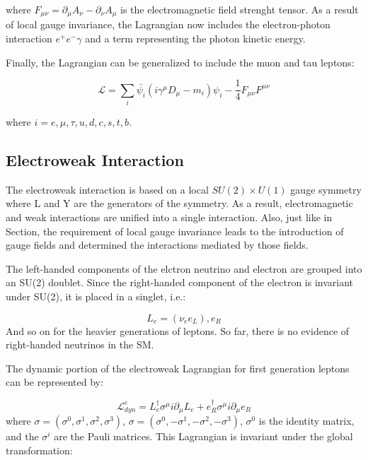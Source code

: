 where $F_{\mu\nu}= \partial_{\mu}A_{\nu} - \partial_{\nu}A_{\mu}$ is the electromagnetic field strenght tensor. As a result of local gauge invariance, the Lagrangian now includes the electron-photon interaction $e^{+}e^{-}\gamma$ and a term representing the photon kinetic energy.

Finally, the Lagrangian can be generalized to include the muon and tau leptons:

\begin{equation}
\mathcal{L} = \sum_{i}\bar{\psi_{i}}(i\gamma^{\mu}D_{\mu}-m_{i})\psi_{i} - \frac{1}{4}F_{\mu\nu}F^{\mu\nu}
\end{equation}

where $i=e,\mu,\tau,u,d,c,s,t,b$.

\subsection{Electroweak Interaction}

The electroweak interaction is based on a local $SU(2)\times U(1)$ gauge symmetry where L and Y are the generators of the symmetry. As a result, electromagnetic and weak interactions are unified into a single interaction. Also, just like in Section, the requirement of local gauge invariance leads to the introduction of gauge fields and determined the interactions mediated by those fields.

The left-handed components of the elctron neutrino and electron are grouped into an SU(2) doublet. Since the right-handed component of the electron is invariant under SU(2), it is placed in a singlet, i.e.:

\begin{equation}
L_{e} = (\nu_{e} e_{L}), e_{R}
\end{equation}
 And so on for the heavier generations of leptons. So far, there is no evidence of right-handed neutrinos in the SM.

 The dynamic portion of the electroweak Lagrangian for first generation leptons can be represented by:

 \begin{equation}
 \mathcal{L}_{dyn}^{e} = L_{e}^{\dagger}\sigma^{\mu}i\partial_{\mu}L_{e}+ e_{R}^{\dagger}\sigma^{\mu}i\partial_{\mu}e_{R}%
 \end{equation}
where $\sigma = (\sigma^{0}, \sigma^{1},\sigma^{2}, \sigma^{3})$, $\sigma = (\sigma^{0}, -\sigma^{1},-\sigma^{2}, -\sigma^{3})$, $\sigma^{0}$ is the identity matrix, and the $\sigma^{i}$ are the Pauli matrices. This Lagrangian is invariant under the global transformation:

